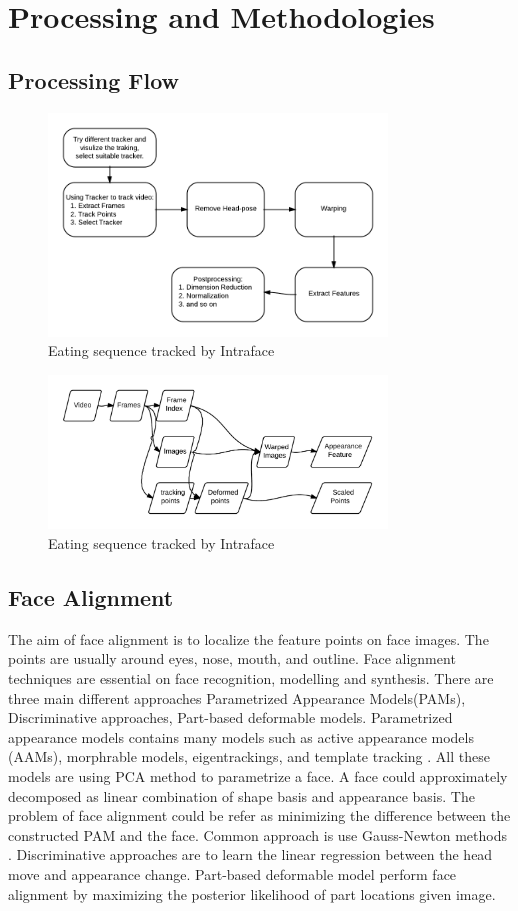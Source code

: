 \chapter{Processing and Methodologies}

\section{Processing Flow}

\begin{figure}[ht!]
\centering
\includegraphics[width=90mm]{imgs/ProcedureChart.png}
\caption{Eating sequence tracked by Intraface}
\end{figure}

\begin{figure}[ht!]
\centering
\includegraphics[width=90mm]{imgs/DataFlowChart.png}
\caption{Eating sequence tracked by Intraface}
\end{figure}

\section{Face Alignment}
The aim of face alignment is to localize the feature points on face images. The points are usually around eyes, nose, mouth, and outline. Face alignment techniques are essential on face recognition, modelling and synthesis. There are three main different approaches Parametrized Appearance Models(PAMs), Discriminative approaches, Part-based deformable models. Parametrized appearance models contains many models such as active appearance models (AAMs), morphrable models, eigentrackings, and template tracking \cite{xiong2013supervised}. All these models are using PCA method to parametrize a face. A face could approximately decomposed as linear combination of shape basis and appearance basis. The problem of face alignment could be refer as minimizing the difference between the constructed PAM and the face. Common approach is use Gauss-Newton methods \cite{xiong2013supervised}. Discriminative approaches are to learn the linear regression between the head move and appearance change. Part-based deformable model perform face alignment by maximizing the posterior likelihood of part locations given image\cite{xiong2013supervised}. 

